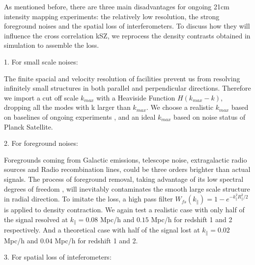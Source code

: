 As mentioned before, there are three main disadvantages for ongoing 21cm intensity mapping experiments: 
the relatively low resolution, 
the strong foreground noises 
and the spatial loss of interferometers. 
To discuss how they will influence the cross correlation kSZ, 
we reprocess the density contrasts obtained in simulation to 
assemble the loss. 

1. For small scale noises:

The finite spacial and velocity resolution of facilities 
prevent us from resolving infinitely small structures in both parallel and perpendicular directions. 
Therefore we import a cut off scale $k_{max}$ with a Heaviside Function 
$H(k_{max}-k)$, dropping all the modes with k larger than $k_{max}$. 
We choose a realistic $k_{max}$ based on baselines of ongoing experiments 
\cite{HIRAX,2014SPIE.9145E..22B,2014SPIE.9145E..4VN,2012IJMPS..12..256C,2015ApJ...798...40X}, 
and an ideal $k_{max}$ based on noise status of Planck Satellite.

2. For foreground noises:

Foregrounds coming from Galactic emissions, telescope noise, 
extragalactic radio sources and Radio recombination lines, 
could be three orders brighter than actual signals\cite{DiMatteo04,Masui13}. 
The process of foreground removal, taking advantage of its low spectral
degrees of freedom \cite{Switzer15}, 
will inevitably contaminates the smooth large scale structure in radial direction.  
To imitate the loss, a high pass filter $W_{fs}(k_\parallel)=1-e^{-k_\parallel^2R_\parallel^2/2}$ is applied to density contraction. 
We again test a realistic case \cite{2013ApJ...763L..20M,Switzer13}
with 
only half of the signal resolved at $k_\parallel=0.08$ Mpc/h and $0.15$ Mpc/h 
for redshift 1 and 2 respectively. 
And a theoretical case \cite{15Shaw} with half of the signal lost 
at $k_\parallel=0.02$ Mpc/h and $0.04$ Mpc/h for redshift 1 and 2. 

3. For spatial loss of inteferometers:

